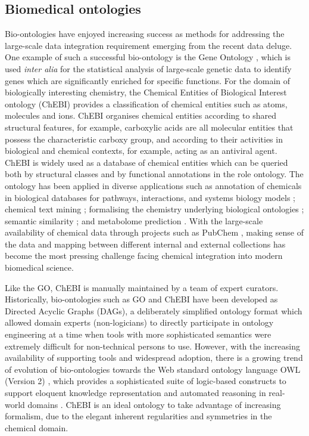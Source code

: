 \documentclass[10pt]{bmc_article}
\newenvironment{bmcformat}{\baselineskip20pt\sloppy\setboolean{publ}{false}}{\baselineskip20pt\sloppy}
\begin{document}
\begin{bmcformat}
\subsection*{Biomedical ontologies}

Bio-ontologies have enjoyed increasing success as methods for addressing the large-scale data integration requirement emerging from the recent data deluge. One example of such a successful bio-ontology is the Gene Ontology \cite{go2000}, which is used \textit{inter alia} for the statistical analysis of large-scale genetic data to identify genes which are significantly enriched for specific functions.  For the domain of biologically interesting chemistry, the Chemical Entities of Biological Interest ontology (ChEBI) \cite{chebi2010} provides a classification of chemical entities such as atoms, molecules and ions.  ChEBI organises chemical entities according to shared structural features, for example, carboxylic acids are all molecular entities that possess the characteristic carboxy group, and according to their activities in biological and chemical contexts, for example, acting as an antiviral agent. ChEBI is widely used as a database of chemical entities which can be queried both by structural classes and by functional annotations in the role ontology. The ontology has been applied in diverse applications such as annotation of chemicals in biological databases for pathways, interactions, and systems biology models \cite{matthews2009,libiomodels2010,kerrien2007}; chemical text mining \cite{corbett2006}; formalising the chemistry underlying biological ontologies \cite{mungall2010}; semantic similarity \cite{couto2010}; and metabolome prediction \cite{swainston2010}. With the large-scale availability of chemical data through projects such as PubChem \cite{bolton2008}, making sense of the data and mapping between different internal and external collections has become the most pressing challenge facing chemical integration into modern biomedical science. 

Like the GO, ChEBI is manually maintained by a team of expert curators.  Historically, bio-ontologies such as GO and ChEBI have been developed as Directed Acyclic Graphs (DAGs), a deliberately simplified ontology format which allowed domain experts (non-logicians) to directly participate in ontology engineering at a time when tools with more sophisticated semantics were extremely difficult for non-technical persons to use. However, with the increasing availability of supporting tools and widespread adoption, there is a growing trend of evolution of bio-ontologies towards the Web standard ontology language OWL (Version 2) \cite{OWL2NextStep}, which provides a sophisticated suite of logic-based constructs to support eloquent knowledge representation and automated reasoning in real-world domains \cite{alterovitz2010}.  ChEBI is an ideal ontology to take advantage of increasing formalism, due to the elegant inherent regularities and symmetries in the chemical domain.  



\end{bmcformat}
\end{document}

